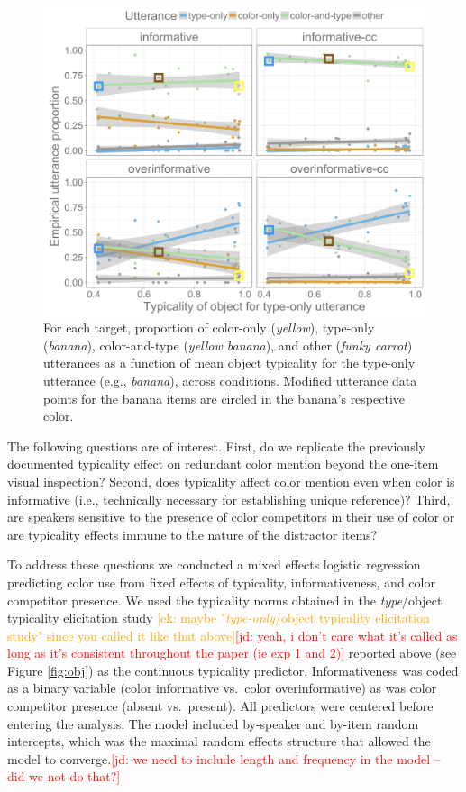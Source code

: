 \documentclass[11pt]{article}
\newcommand{\jd}[1]{\textcolor{Red}{[jd: #1]}}
\newcommand{\ek}[1]{\textcolor{Orange}{[ek: #1]}}
\newcommand{\figref}[1]{Figure \ref{#1}}
\begin{document}
\begin{figure}[h!]
\centering
\includegraphics[width=.8\textwidth]{pics/empiricalProportions_typ.png}
\caption{For each target, proportion of color-only (\emph{yellow}), type-only (\emph{banana}), color-and-type (\emph{yellow banana}), and other (\emph{funky carrot}) utterances as a function of mean object typicality for the type-only utterance (e.g., \emph{banana}), across conditions. Modified utterance data points for the banana items are circled in the banana's respective color.}
\label{fig:proportions}
\end{figure}

The following questions are of interest. First, do we replicate the previously documented typicality effect on redundant color mention beyond the one-item visual inspection? Second, does typicality affect color mention even when color is informative (i.e., technically necessary for establishing unique reference)? Third, are speakers sensitive to the presence of color competitors in their use of color or are typicality effects immune to the nature of the distractor items?

To address these questions we conducted a mixed effects logistic regression predicting color use from fixed effects of typicality, informativeness, and color competitor presence. We used the typicality norms obtained in the \emph{type}/object typicality elicitation study \ek{maybe "\emph{type-only}/object typicality elicitation study" since you called it like that above}\jd{yeah, i don't care what it's called as long as it's consistent throughout the paper (ie exp 1 and 2)} reported above (see \figref{fig:obj}) as the continuous typicality predictor. Informativeness was coded as a binary variable (color informative vs.~color overinformative) as was color competitor presence (absent vs.~present). All predictors were centered before entering the analysis. The model included by-speaker and by-item random intercepts, which was the maximal random effects structure that allowed the model to converge.\jd{we need to include length and frequency in the model -- did we not do that?}
\end{document}
